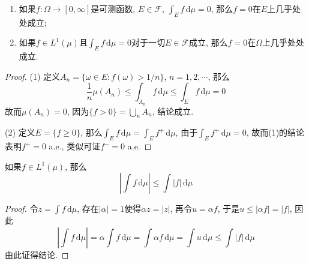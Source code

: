 \documentclass[cn, 12pt, math=mtpro2, bibstyle=apa, blue, twocol]{elegantbook}
\newcommand{\F}{\mathcal{F}}
\newcommand{\du}{\,\text{d}\mu}
\begin{document}
\begin{theorem}\label{thm:thm1.19}
  \begin{enumerate}[label=(\arabic*)]
    \item 如果$f:\Omega\to[0,\infty]$是可测函数, $E\in\F$, $\int_Ef\,\text{d}\mu=0$, 那么$f=0$在$E$上几乎处处成立;
    \item 如果$f\in L^1(\mu)$且$\int_Ef\,\text{d}\mu=0$对于一切$E\in\F$成立, 那么$f=0$在$\Omega$上几乎处处成立.
  \end{enumerate}
\end{theorem}
\begin{proof}
  (1) 定义$A_n=\{\omega\in E: f(\omega)>1/n \}$, $n=1,2,\cdots$, 那么
  $$\frac{1}{n}\mu(A_n)\leq\int_{A_n}f\,\text{d}\mu\leq\int_Ef\,\text{d}\mu=0$$
  故而$\mu(A_n)=0$, 因为$\{f>0\}=\bigcup_nA_n$, 结论成立.

  (2) 定义$E=\{f\ge0\}$, 那么$\int_Ef\,\text{d}\mu=\int_Ef^+\,\text{d}\mu$, 由于$\int_Ef^+\,\text{d}\mu=0$, 故而(1)的结论表明$f^+=0$ a.e., 类似可证$f^-=0$ a.e.
\end{proof}

\begin{lemma}\label{lem:lem1.2}
如果$f\in L^1(\mu)$, 那么
$$\left|\int f\du \right|\leq\int|f|\du$$
\end{lemma}
\begin{proof}
  令$z=\int f\du$, 存在$|\alpha|=1$使得$\alpha z=|z|$, 再令$u=\alpha f$, 于是$u\leq |\alpha f|=|f|$, 因此
  $$\left|\int f\du\right|=\alpha\int f\du=\int\alpha f\du=\int u\du\leq\int |f|\du$$
  由此证得结论.
\end{proof}
\end{document}
